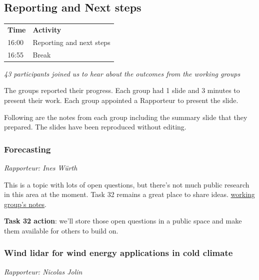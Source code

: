 \subsection{Reporting and Next steps}

\begin{table}[!h]
    \centering
    \begin{tabular}{@{}|p{}|p{}|@{}}
    \rowcolor{Task32Blue2} \textbf{Time} & \textbf{Activity} \\    
    16:00 & Reporting and next steps \\
    16:55 & Break
    \end{tabular}
    \label{tab:day4-results-agenda}
\end{table}

\emph{43 participants joined us to hear about the outcomes from the working groups}

The groups reported their progress. Each group had 1 slide and 3 minutes to present their work. Each group appointed a Rapporteur to present the slide.

Following are the notes from each group including the summary slide that they prepared. The slides have been reproduced without editing.

\subsubsection{Forecasting}

\emph{Rapporteur: Ines Würth}

This is a topic with lots of open questions, but there's not much public research in this area at the moment. Task 32 remains a great place to share ideas. %
\href{https://docs.google.com/document/d/1Yq2JyWJAEZVAJE9te4FJ-57OpXdxNRHWhks88l2YJcI/edit?usp=sharing}{working
group's notes}.

\textbf{Task 32 action}: we'll store those open questions in a public space and make them available for others to build on.

\subsubsection{Wind lidar for wind energy applications in cold climate}

\emph{Rapporteur: Nicolas Jolin}

